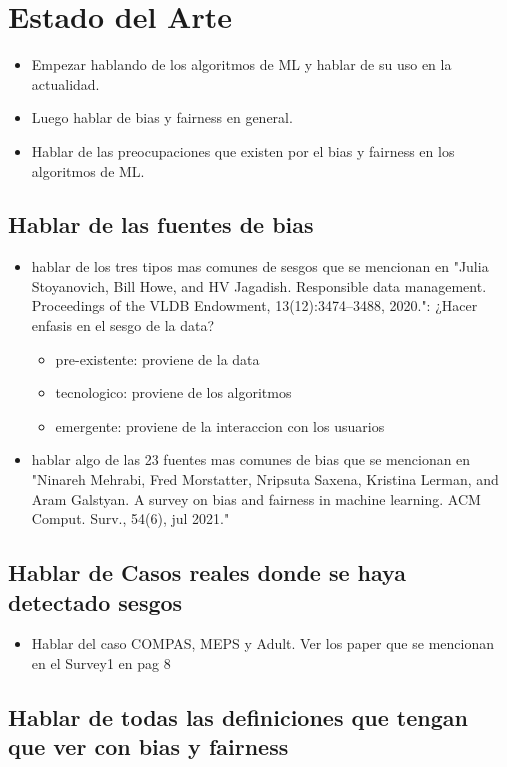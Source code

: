 \chapter{Estado del Arte}\label{chapter:state-of-the-art}


\begin{itemize}
    \item Empezar hablando de los algoritmos de ML y hablar de su uso en la actualidad.
    \item Luego hablar de bias y fairness en general.
    \item Hablar de las preocupaciones que existen por el bias y fairness en los algoritmos de ML.
\end{itemize}

\section{Hablar de las fuentes de bias}
\begin{itemize}
    \item hablar de los tres tipos mas comunes de sesgos que se mencionan en "Julia Stoyanovich, Bill Howe, and HV Jagadish. Responsible data management. Proceedings of the VLDB
    Endowment, 13(12):3474–3488, 2020.": ¿Hacer enfasis en el sesgo de la data?
    \begin{itemize}
        \item pre-existente: proviene de la data
        \item tecnologico: proviene de los algoritmos
        \item emergente: proviene de la interaccion con los usuarios
    \end{itemize}
    \item hablar algo de las 23 fuentes mas comunes de bias 
    que se mencionan en "Ninareh Mehrabi, Fred Morstatter, Nripsuta Saxena, Kristina Lerman, and Aram Galstyan. A survey on bias and
    fairness in machine learning. ACM Comput. Surv., 54(6), jul 2021."
\end{itemize}

\section{Hablar de Casos reales donde se haya detectado sesgos}

    \begin{itemize}
        \item Hablar del caso COMPAS, MEPS y Adult. Ver los paper que se mencionan en el Survey1 en pag 8
    \end{itemize}

\section{Hablar de todas las definiciones que tengan que ver con bias y fairness}



